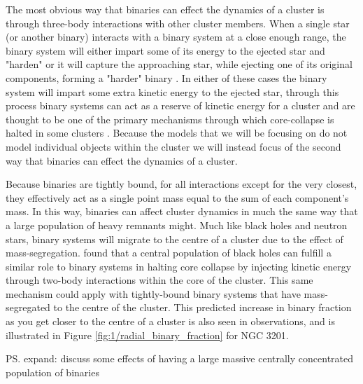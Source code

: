 




The most obvious way that binaries can effect the dynamics of a cluster is through three-body
interactions with other cluster members. When a single star (or another binary) interacts with a
binary system at a close enough range, the binary system will either impart some of its energy to
the ejected star and "harden" or it will capture the approaching star, while ejecting one of its
original components, forming a "harder" binary \citep{Heggie2003}. In either of these cases the
binary system will impart some extra kinetic energy to the ejected star, through this process binary
systems can act as a reserve of kinetic energy for a cluster and are thought to be one of the
primary mechanisms through which core-collapse is halted in some clusters \citep{Chatterjee2013}.
Because the models that we will be focusing on do not model individual objects within the cluster we
will instead focus of the second way that binaries can effect the dynamics of a cluster.

Because binaries are tightly bound, for all interactions except for the very closest, they
effectively act as a single point mass equal to the sum of each component's mass. In this way,
binaries can affect cluster dynamics in much the same way that a large population of heavy remnants
might. Much like black holes and neutron stars, binary systems will migrate to the centre of a
cluster due to the effect of mass-segregation. \citet{Kremer2019} found that a central population of
black holes can fulfill a similar role to binary systems in halting core collapse by injecting
kinetic energy through two-body interactions within the core of the cluster. This same mechanism
could apply with tightly-bound binary systems that have mass-segregated to the centre of the
cluster. This predicted increase in binary fraction as you get closer to the centre of a cluster is
also seen in observations, and is illustrated in Figure \ref{fig:1/radial_binary_fraction} for NGC
3201.

\ps{expand: discuss some effects of having a large massive centrally concentrated population of binaries}



